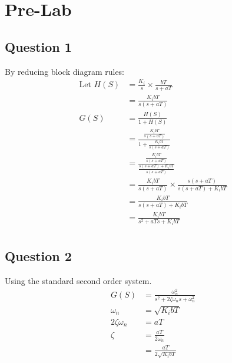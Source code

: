 \documentclass{article}
\begin{document}


\section*{Pre-Lab} %
\label{sec:pre_lab}

\subsection*{Question 1} %
\label{sub:question_1}
By reducing block diagram rules:
\begin{align*}
    \text{Let } H(S) &= \frac{K_i}{s}\times \frac{bT}{s+aT}\\
                    &= \frac{K_ibT}{s(s+aT)}\\
    G(S) &= \frac{H(S)}{1+ H(S)}\\
        &= \frac{\frac{K_ibT}{s(s+aT)}}{1+ \frac{K_ibT}{s(s+aT)}}\\
        &= \frac{\frac{K_ibT}{s(s+aT)}}{\frac{s(s+aT) + K_ibT}{s(s+aT)}}\\
        &= \frac{K_ibT}{s(s+aT)} \times \frac{s(s+aT)}{s(s+aT) + K_ibT}\\
        &= \frac{K_ibT}{s(s+aT) + K_ibT}\\
        &= \frac{K_ibT}{s^2 + aTs + K_ibT}\\
\end{align*}

\subsection*{Question 2} %
\label{sub:question_2}
Using the standard second order system.
\begin{align*}
G(S) &= \frac{\omega_n^2}{s^2 + 2\zeta\omega_ns + \omega_n^2}\\
\omega_n &= \sqrt{K_ibT}\\
2\zeta\omega_n &= aT\\
\zeta &= \frac{aT}{2\omega_n}\\
     &= \frac{aT}{2\sqrt{K_ibT}}\\
\end{align*}

\end{document}
